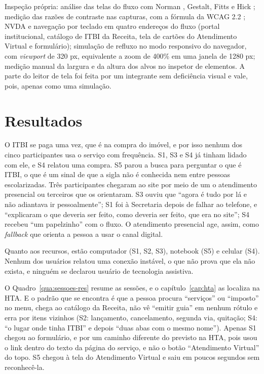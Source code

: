 \documentclass[
  12pt,
  oneside,
  a4paper,
  chapter=TITLE,
  section=TITLE,
  english,
  brazilian
]{abntex2}
\begin{document}
Inspeção própria: análise das telas do fluxo com Norman
\cite{norman2013}, Gestalt, Fitts \cite{fitts1954} e Hick \cite{hick1952}; medição das razões de contraste nas capturas, com a fórmula da WCAG 2.2
\cite{wcag22}; NVDA e navegação por teclado em quatro endereços do fluxo
(portal institucional, catálogo de ITBI da Receita, tela de cartões do
Atendimento Virtual e formulário); simulação de refluxo no modo responsivo do
navegador, com \textit{viewport} de 320 px, equivalente a zoom de 400\% em uma
janela de 1280 px; medição manual da largura e da altura dos alvos no
inspetor de elementos. A parte do leitor de tela foi feita por um integrante sem deficiência
visual e vale, pois, apenas como uma simulação.

\section{Resultados}

O ITBI se paga uma vez, que é na compra do imóvel, e por isso nenhum dos cinco
participantes usa o serviço com frequência. S1, S3 e S4 já tinham lidado com
ele, e S4 relatou uma compra. S5 parou a busca para perguntar o que é ITBI, o que é um sinal
de que a sigla não é conhecida nem entre pessoas escolarizadas. Três
participantes chegaram ao site por meio de um o atendimento presencial ou terceiros que os orientaram. S3 ouviu que ``agora é tudo por lá e não adiantava ir
pessoalmente''; S1 foi à Secretaria depois de falhar ao telefone, e
``explicaram o que deveria ser feito, como deveria ser feito, que era no site'';
S4 recebeu ``um papelzinho'' com o fluxo. O atendimento presencial age, assim,
como \textit{fallback} que orienta a pessoa a usar o canal digital.

Quanto aos recursos, estão computador (S1, S2, S3), notebook (S5) e celular (S4).
Nenhum dos usuários relatou uma conexão instável, o que não prova que ela não exista, e ninguém
se declarou usuário de tecnologia assistiva.

O Quadro~\ref{qua:sessoes-res} resume as sessões, e o
capítulo~\ref{cap:hta} as localiza na HTA. E o padrão que se encontra é que a pessoa procura
``serviços'' ou ``imposto'' no menu, chega ao catálogo da Receita, não vê
``emitir guia'' em nenhum rótulo e erra por itens vizinhos (S2: lançamento,
cancelamento, segunda via, quitação; S4: ``o lugar onde tinha ITBI'' e depois
``duas abas com o mesmo nome''). Apenas S1 chegou ao formulário, e por um caminho
diferente do previsto na HTA, pois usou o link dentro do texto da página do serviço, e não
o botão ``Atendimento Virtual'' do topo. S5 chegou à tela do Atendimento Virtual
e saiu em poucos segundos sem reconhecê-la.
\end{document}
